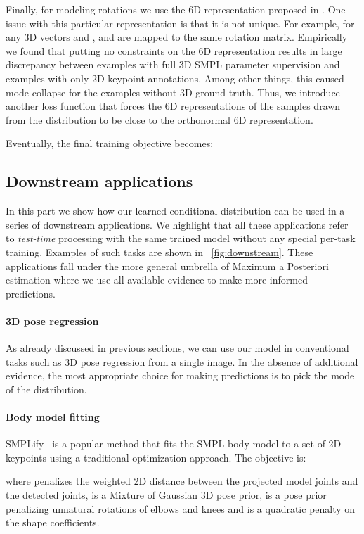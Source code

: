 Finally, for modeling rotations we use the 6D representation proposed in \cite{zhou2018continuity}. One issue with this particular representation is that it is not unique. For example, for any 3D vectors  and ,  and  are mapped to the same rotation matrix. Empirically we found that putting no constraints on the 6D representation results in large discrepancy between examples with full 3D SMPL parameter supervision and examples with only 2D keypoint annotations. Among other things, this caused mode collapse for the examples without 3D ground truth. Thus, we introduce another loss function  that forces the 6D representations of the samples drawn from the distribution to be close to the orthonormal 6D representation.

Eventually, the final training objective becomes:


\subsection{Downstream applications}
In this part we show how our learned conditional distribution can be used in a series of downstream applications. We highlight that all these applications refer to \emph{test-time} processing with the same trained model without any special per-task training. Examples of such tasks are shown in \figurename~\ref{fig:downstream}. These applications fall under the more general umbrella of Maximum a Posteriori estimation where we use all available evidence to make more informed predictions.

\paragraph{3D pose regression}
As already discussed in previous sections, we can use our model in conventional tasks such as 3D pose regression from a single image.
In the absence of additional evidence, the most appropriate choice for making predictions is to pick the mode  of the distribution.

\paragraph{Body model fitting}
SMPLify~\cite{bogo2016keep} is a popular method that fits the SMPL body model to a set of 2D keypoints using a traditional optimization approach. The objective is:

where  penalizes the weighted 2D distance between the projected model joints and the detected joints,  is a Mixture of Gaussian 3D pose prior,  is a pose prior penalizing unnatural rotations of elbows and knees and  is a quadratic penalty on the shape coefficients.

